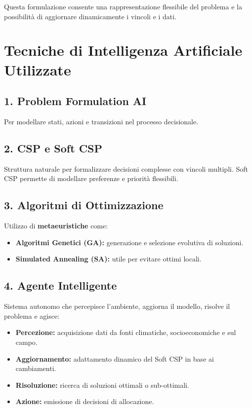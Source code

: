 \documentclass[a4paper,12pt]{article}
\begin{document}
Questa formulazione consente una rappresentazione flessibile del problema e la possibilità di aggiornare dinamicamente i vincoli e i dati.

\section*{Tecniche di Intelligenza Artificiale Utilizzate}

\subsection*{1. Problem Formulation AI}
Per modellare stati, azioni e transizioni nel processo decisionale.

\subsection*{2. CSP e Soft CSP}
Struttura naturale per formalizzare decisioni complesse con vincoli multipli. Soft CSP permette di modellare preferenze e priorità flessibili.

\subsection*{3. Algoritmi di Ottimizzazione}
Utilizzo di \textbf{metaeuristiche} come:
\begin{itemize}
    \item \textbf{Algoritmi Genetici (GA):} generazione e selezione evolutiva di soluzioni.
    \item \textbf{Simulated Annealing (SA):} utile per evitare ottimi locali.
\end{itemize}

\subsection*{4. Agente Intelligente}
Sistema autonomo che percepisce l’ambiente, aggiorna il modello, risolve il problema e agisce:

\begin{itemize}
    \item \textbf{Percezione:} acquisizione dati da fonti climatiche, socioeconomiche e sul campo.
    \item \textbf{Aggiornamento:} adattamento dinamico del Soft CSP in base ai cambiamenti.
    \item \textbf{Risoluzione:} ricerca di soluzioni ottimali o sub-ottimali.
    \item \textbf{Azione:} emissione di decisioni di allocazione.
\end{itemize}
\end{document}
